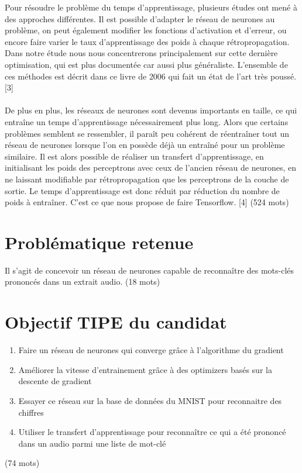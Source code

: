 \documentclass[12pt,a4paper, french]{article}
\begin{document}
Pour résoudre le problème du temps d’apprentissage, plusieurs études ont mené à des approches différentes. Il est possible d'adapter le réseau de neurones au problème, on peut également modifier les fonctions d’activation et d’erreur, ou encore faire varier le taux d’apprentissage des poids à chaque rétropropagation. Dans notre étude nous nous concentrerons principalement sur cette dernière optimisation, qui est plus documentée car aussi plus généraliste. 
L’ensemble de ces méthodes est décrit dans ce livre de 2006 qui fait un état de l’art très poussé. [3]\\
\\
De plus en plus, les réseaux de neurones sont devenus importants en taille, ce qui entraîne un temps d’apprentissage nécessairement plus long. Alors que certains problèmes semblent se ressembler, il paraît peu cohérent de réentraîner tout un réseau de neurones lorsque l'on en possède déjà un entraîné pour un problème similaire. Il est alors possible de réaliser un transfert d'apprentissage, en initialisant les poids des perceptrons avec ceux de l'ancien réseau de neurones, en ne laissant modifiable par rétropropagation que les perceptrons de la couche de sortie. Le temps d'apprentissage est donc réduit par réduction du nombre de poids à entraîner. C'est ce que nous propose de faire Tensorflow. [4]
(524 mots)


\section*{Problématique retenue}
Il s’agit de concevoir un réseau de neurones capable de reconnaître des mots-clés prononcés dans un extrait audio.
(18 mots)



\section*{Objectif TIPE du candidat}
\begin{enumerate}
    \item Faire un réseau de neurones qui converge grâce à l’algorithme du gradient
    \item Améliorer la vitesse d'entrainement grâce à des optimizers basés sur la descente de gradient
    \item Essayer ce réseau sur la base de données du MNIST pour reconnaitre des chiffres
    \item Utiliser le transfert d'apprentissage pour reconnaître ce qui a été prononcé dans un audio parmi une liste de mot-clé
\end{enumerate}
(74 mots)
\end{document}
